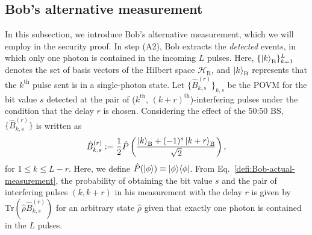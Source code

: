 \documentclass[twocolumn,superscriptaddress,pra,footinbib,notitlepage]{revtex4-1}
\newcommand{\ketbra}[2]{| #1 \rangle \langle #2 |}
\newcommand{\tr}[1]{\mathrm{Tr}\left(#1\right)}
\newcommand{\1}{\mbox{1}\hspace{-0.25em}\mbox{l}}
\begin{document}
\subsection{Bob's alternative measurement}
\label{subsec:dial-measurement}
In this subsection, we introduce Bob's alternative measurement, which we will employ in the security proof. 
In step (A2), Bob extracts the \textit{detected} events, in which only one photon is contained in the incoming $L$ pulses. Here, $\{\ket{k}_\textrm{B}\}_{k=1}^L$ denotes the set of basis vectors of the Hilbert space $\mathcal{H}_\textrm{B}$, and $\ket{k}_\textrm{B}$ represents that the $k^\mathrm{th}$ pulse sent is in a single-photon state. Let $\{\hat{B}_{k, s}^{(r)}\}_{k, s}$ be the POVM for the bit value $s$ detected at the pair of ($k^\mathrm{th}$, $(k+r)^\mathrm{th}$)-interfering pulses under the condition that the delay $r$ is chosen.
Considering the effect of the 50:50 BS, $\{\hat{B}_{k, s}^{(r)}\}$ is written as
\begin{align}
\hat{B}_{k, s}^{(r)}:=\frac{1}{2}\hat{P}\left(\frac{\ket{k}_\textrm{B}+(-1)^s\ket{k+r}_\textrm{B}}{\sqrt{2}}\right),\label{defi:Bob-actual-measurement}
\end{align}
for $1\leq k\leq L-r$.
Here, we define $\hat{P}(\ket{\phi})\equiv\ketbra{\phi}{\phi}$. From Eq.~\eqref{defi:Bob-actual-measurement}, the probability of obtaining the bit value $s$ and the pair of interfering pulses $(k, k+r)$ in his measurement with the delay $r$ is given by $\tr{\hat{\rho}\hat{B}_{k, s}^{(r)}}$ for an arbitrary state $\hat{\rho}$ given that exactly one photon is contained in the $L$ pulses.
\end{document}
